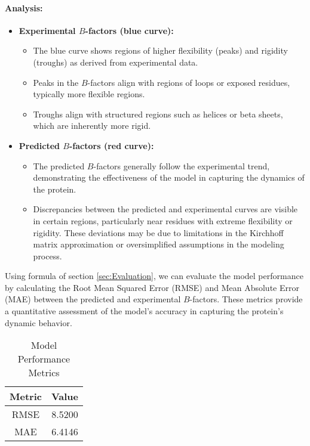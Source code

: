 \documentclass[English, Lau, oneside]{sapthesis}
\begin{document}
\paragraph{Analysis:}
\begin{itemize}
    \item \textbf{Experimental \( B \)-factors (blue curve):}
    \begin{itemize}
        \item The blue curve shows regions of higher flexibility (peaks) and rigidity (troughs) as derived from experimental data.
        \item Peaks in the \( B \)-factors align with regions of loops or exposed residues, typically more flexible regions.
        \item Troughs align with structured regions such as helices or beta sheets, which are inherently more rigid.
    \end{itemize}

    \item \textbf{Predicted \( B \)-factors (red curve):}
    \begin{itemize}
        \item The predicted \( B \)-factors generally follow the experimental trend, demonstrating the effectiveness of the model in capturing the dynamics of the protein.
        \item Discrepancies between the predicted and experimental curves are visible in certain regions, particularly near residues with extreme flexibility or rigidity. These deviations may be due to limitations in the Kirchhoff matrix approximation or oversimplified assumptions in the modeling process.
    \end{itemize}
\end{itemize}
Using formula of section \ref{sec:Evaluation}, we can evaluate the model performance by calculating the Root Mean Squared Error (RMSE) and Mean Absolute Error (MAE) between the predicted and experimental \( B \)-factors. 
These metrics provide a quantitative assessment of the model's accuracy in capturing the protein's dynamic behavior.
\begin{table}[h!]
    \centering
    \begin{tabular}{|c|c|}
    \hline
    \textbf{Metric} & \textbf{Value} \\ \hline
    RMSE & 8.5200 \\ \hline
    MAE  & 6.4146 \\ \hline
    \end{tabular}
    \caption{Model Performance Metrics}
    \label{tab:model_metrics}
\end{table}
\end{document}
